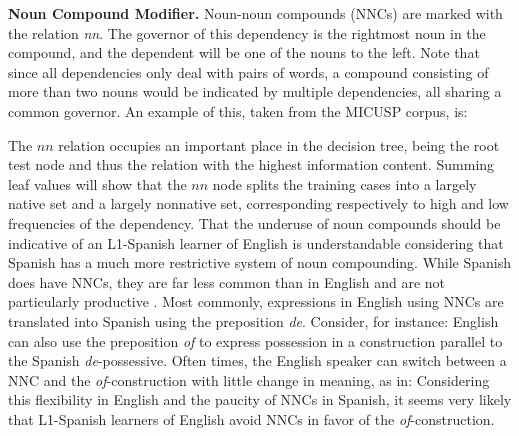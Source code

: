 \documentclass[main.tex]{subfiles}
\begin{document}
\textbf{Noun Compound Modifier.} Noun-noun compounds (NNCs) are marked with the relation \textit{nn}. The governor of this dependency is the rightmost noun in the compound, and the dependent will be one of the nouns to the left. Note that since all dependencies only deal with pairs of words, a compound consisting of more than two nouns would be indicated by multiple dependencies, all sharing a common governor. An example of this, taken from the MICUSP corpus, is:
\newline\newline{}
\newline

The $nn$ relation occupies an important place in the decision tree, being the root test node and thus the relation with the highest information content. Summing leaf values will show that the $nn$ node splits the training cases into a largely native set and a largely nonnative set, corresponding respectively to high and low frequencies of the dependency. That the underuse of noun compounds should be indicative of an L1-Spanish learner of English is understandable considering that Spanish has a much more restrictive system of noun compounding. While Spanish does have NNCs, they are far less common than in English and are not particularly productive \citep{piera:1995}. Most commonly, expressions in English using NNCs are translated into Spanish using the preposition \textit{de}. Consider, for instance:
English can also use the preposition \textit{of} to express possession in a construction parallel to the Spanish \textit{de}-possessive. Often times, the English speaker can switch between a NNC and the \textit{of}-construction with little change in meaning, as in:
Considering this flexibility in English and the paucity of NNCs in Spanish, it seems very likely that L1-Spanish learners of English avoid NNCs in favor of the \textit{of}-construction.
\end{document}
